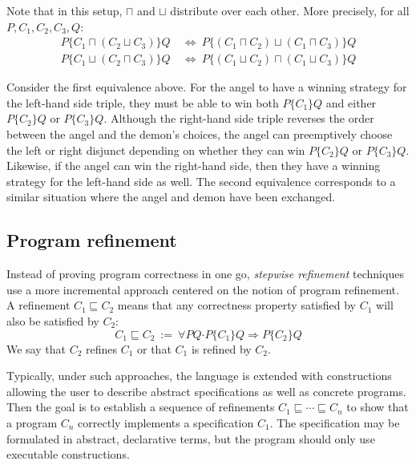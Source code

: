 \documentclass[11pt,oneside,draft]{book}
\theoremstyle{definition}
\newcommand{\bdot}{\boldsymbol{\cdot}}
\newcommand{\htr}[3]{{ {#1} \lbrace {#2} \rbrace {#3} }}
\begin{document}
Note that in this setup,
$\sqcap$ and $\sqcup$ distribute over each other.
More precisely, for all $P, C_1, C_2, C_3, Q$:
\begin{align*}
  \htr{P}{C_1 \sqcap (C_2 \sqcup C_3)}{Q} \: &\Leftrightarrow \:
    \htr{P}{(C_1 \sqcap C_2) \sqcup (C_1 \sqcap C_3)}{Q} \\
  \htr{P}{C_1 \sqcup (C_2 \sqcap C_3)}{Q} \: &\Leftrightarrow \:
    \htr{P}{(C_1 \sqcup C_2) \sqcap (C_1 \sqcup C_3)}{Q}
\end{align*}

Consider the first equivalence above.
For the angel to have a winning strategy for
the left-hand side triple,
they must be able to win both $\htr{P}{C_1}{Q}$
and either $\htr{P}{C_2}{Q}$ or $\htr{P}{C_3}{Q}$.
Although the right-hand side triple
reverses the order between the angel and the demon's choices,
the angel can preemptively choose the left or right
disjunct depending on whether they can win
$\htr{P}{C_2}{Q}$ or $\htr{P}{C_3}{Q}$.
Likewise, if the angel can win the right-hand side,
then they have a winning strategy for the left-hand side as well.
The second equivalence corresponds to a similar situation
where the angel and demon have been exchanged.


\subsection{Program refinement} %

Instead of proving program correctness in one go,
\emph{stepwise refinement} techniques use a more incremental approach
centered on the notion of program refinement.
A refinement $C_1 \sqsubseteq C_2$
means that any correctness property satisfied by $C_1$
will also be satisfied by $C_2$:
\[
    C_1 \sqsubseteq C_2 \: := \:
    \forall P Q \bdot
      \htr{P}{C_1}{Q} \Rightarrow
      \htr{P}{C_2}{Q}
\]
We say that $C_2$ refines $C_1$
or that $C_1$ is refined by $C_2$.

Typically,
under such approaches,
the language is extended with constructions
allowing the user to describe
abstract specifications as well as
concrete programs.
Then the goal is to establish
a sequence of refinements
$C_1 \sqsubseteq \cdots \sqsubseteq C_n$
to show that a program $C_n$
correctly implements a specification $C_1$.
The specification may be formulated in
abstract, declarative terms,
but the program should only use executable constructions.
\end{document}
